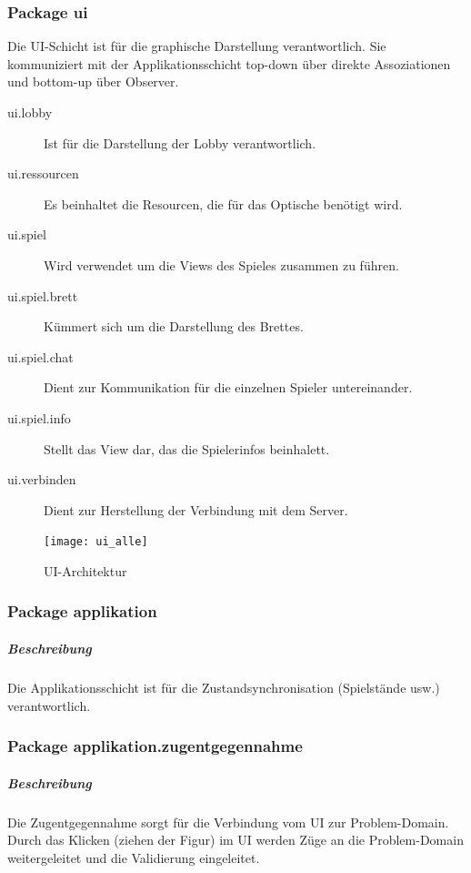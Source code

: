 \documentclass[12pt,halfparskip]{scrartcl}
\begin{document}

\clearpage
\subsubsection{Package ui} %
\label{ssub:package_ui}
Die UI-Schicht ist für die graphische Darstellung verantwortlich. Sie kommuniziert mit der Applikationsschicht top-down über direkte Assoziationen und bottom-up über Observer.

\begin{description}
	\item[ui.lobby] Ist für die Darstellung der Lobby verantwortlich.
	\item[ui.ressourcen] Es beinhaltet die Resourcen, die für das Optische benötigt wird.
	\item[ui.spiel] Wird verwendet um die Views des Spieles zusammen zu führen.
	\item[ui.spiel.brett] Kümmert sich um die Darstellung des Brettes.
	\item[ui.spiel.chat] Dient zur Kommunikation für die einzelnen Spieler untereinander.
	\item[ui.spiel.info] Stellt das View dar, das die Spielerinfos beinhalett.
	\item[ui.verbinden] Dient zur Herstellung der Verbindung mit dem Server.
\end{description}

\begin{figure}[h]
	\centering
	\texttt{[image: ui\_alle]}
	\caption{UI-Architektur}
	\label{fig:ui_alle}
\end{figure}

\clearpage
\subsubsection{Package applikation} %
\label{ssub:package_applikation}
\subparagraph{Beschreibung}
Die Applikationsschicht ist für die Zustandsynchronisation (Spielstände usw.) verantwortlich. 

\subsubsection{Package applikation.zugentgegennahme} %
\label{ssub:package_applikation_zugentgegennahme}
\subparagraph{Beschreibung}
\label{ssub:beschreibung}
Die Zugentgegennahme sorgt für die Verbindung vom UI zur Problem-Domain. Durch das Klicken (ziehen der Figur) im UI werden Züge an die Problem-Domain weitergeleitet und die Validierung eingeleitet.
\end{document}
